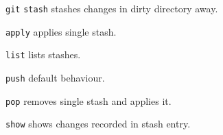 %

\begin{compactenum}
\item [\texttt{git}] \texttt{stash} stashes changes in dirty directory away.
\item [\scriptsize \texttt{apply}] applies single stash.
\item [\scriptsize \texttt{list}] lists stashes.
\item [\scriptsize \texttt{push}] default behaviour.
\item [\scriptsize \texttt{pop}] removes single stash and applies it.
\item [\scriptsize \texttt{show}] shows changes recorded in stash entry.
\end{compactenum}

%